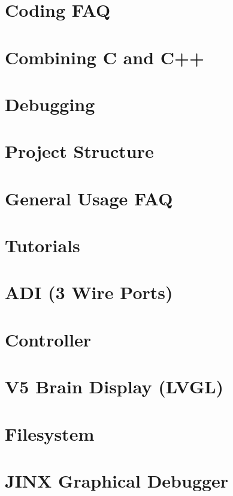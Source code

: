 \documentclass[twoside]{book}
\newcommand{\+}{\discretionary{\mbox{\scriptsize$\hookleftarrow$}}{}{}}
\begin{document}
\chapter{Coding F\+AQ}
\label{autotoc_md22}

\chapter{Combining C and C++}
\label{autotoc_md25}

\chapter{Debugging}
\label{autotoc_md26}

\chapter{Project Structure}
\label{autotoc_md30}

\chapter{General Usage F\+AQ}
\label{autotoc_md34}

\chapter{Tutorials}
\label{autotoc_md36}

\chapter{A\+DI (3 Wire Ports)}
\label{autotoc_md40}

\chapter{Controller}
\label{autotoc_md51}

\chapter{V5 Brain Display (L\+V\+GL)}
\label{autotoc_md54}

\chapter{Filesystem}
\label{autotoc_md55}

\chapter{J\+I\+NX Graphical Debugger}
\label{autotoc_md58}

\end{document}
